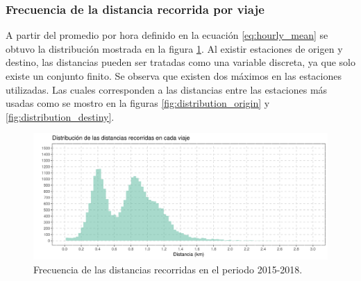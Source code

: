 \subsubsection{Frecuencia de la distancia recorrida por viaje}

A partir del promedio por hora definido en la ecuación \ref{eq:hourly_mean} se obtuvo la distribución mostrada en la figura \ref{fig:distribution_distances}. Al existir estaciones de origen y destino, las distancias pueden ser tratadas como una variable discreta, ya que solo existe un conjunto finito. Se observa que existen dos máximos en las estaciones utilizadas. Las cuales corresponden a las distancias entre las estaciones más usadas como se mostro en la figuras \ref{fig:distribution_origin} y \ref{fig:distribution_destiny}.

\begin{figure}[H]
    \centering
    \includegraphics[width=16cm]{Graphics/distribution_distance.png}
    \caption{Frecuencia de las distancias recorridas en el periodo 2015-2018.}
    \label{fig:distribution_distances}
\end{figure}